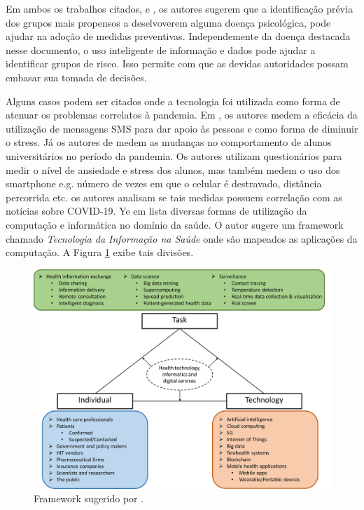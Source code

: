\documentclass[11pt, notitlepage]{article} %
\begin{document}
Em ambos os trabalhos citados, \cite{PMID:32298802} e \cite{wang2020immediate}, os autores sugerem que a identificação prévia dos grupos mais propensos a deselvoverem alguma doença psicológica, pode ajudar na adoção de medidas preventivas. 
Independemente da doença destacada nesse documento, o uso inteligente de informação e dados pode ajudar a identificar grupos de risco. Isso permite com que as devidas autoridades possam embasar sua tomada de decisões.

Alguns casos podem ser citados onde a tecnologia foi utilizada como forma de atenuar os problemas correlatos à pandemia. Em \cite{info:doi/10.2196/19292}, os autores medem a eficácia da utilização de mensagens SMS para dar apoio às pessoas e como forma de diminuir o stress. Já os autores de \cite{info:doi/10.2196/20185} medem as mudanças no comportamento de alunos universitários no período da pandemia. Os autores utilizam questionários para medir o nível de ansiedade e stress dos alunos, mas também medem o uso dos smartphone e.g. número de vezes em que o celular é destravado, distância percorrida etc. os autores analisam se tais medidas possuem correlação com as notícias sobre COVID-19.
Ye em \cite{info:doi/10.2196/19866} lista diversas formas de utilização da computação e informática no domínio da saúde. O autor sugere um framework chamado \emph{Tecnologia da Informação na Saúde} onde são mapeados as aplicações da computação. A Figura \ref{fig:HITframework} exibe tais divisões.

\begin{figure}[!ht]
  \centering
  \includegraphics[scale=.4]{Figures/19866-391235-1-PB.png}
  \caption{Framework sugerido por \cite{info:doi/10.2196/19866}.}
  \label{fig:HITframework}
\end{figure}  
\end{document}
